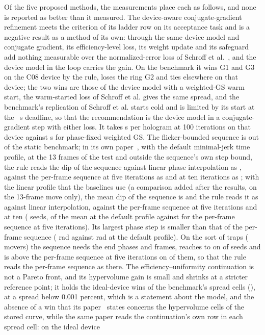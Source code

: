 Of the five proposed methods, the measurements place each as follows, and none is reported as better than it measured. The device-aware conjugate-gradient refinement meets the criterion of its ladder row on its acceptance task and is a negative result as a method of its own: through the same device model and conjugate gradient, its efficiency-level loss, its weight update and its safeguard add nothing measurable over the normalized-error loss of Schroff et al.~\cite{schroff}, and the device model in the loop carries the gain. On the benchmark it wins G1 and G3 on the C08 device by the rule, loses the ring G2 and ties elsewhere on that device; the two wins are those of the device model with a weighted-GS warm start, the warm-started loss of Schroff et al. gives the same spread, and the benchmark's replication of Schroff et al. starts cold and is limited by its start at the \dlReadS{}~s deadline, so that the recommendation is the device model in a conjugate-gradient step with either loss. It takes \benchSecDeviceBOne{} s per hologram at 100 iterations on that device against \benchSecDevicePF{} s for phase-fixed weighted GS. The flicker-bounded sequence is out of the static benchmark; in its own paper~\cite{flickerpaper}, with the default minimal-jerk time profile, at the 13 frames of the test and outside the sequence's own step bound, the rule reads the dip of the sequence against linear phase interpolation as , against the per-frame sequence at five iterations as  and at ten iterations as ; with the linear profile that the baselines use (a comparison added after the results, on the 13-frame move only), the mean dip of the sequence is  and the rule reads it as  against linear interpolation,  against the per-frame sequence at five iterations and  at ten ( seeds,  of the mean at the default profile against  for the per-frame sequence at five iterations). Its largest phase step is smaller than that of the per-frame sequence ( rad against  rad at the default profile). On the sort of  traps ( movers) the sequence needs the end phases and  frames, reaches  to  on  of  seeds and is above the per-frame sequence at five iterations on  of them, so that the rule reads the per-frame sequence as  there. The efficiency--uniformity continuation is not a Pareto front, and its hypervolume gain is small and shrinks at a stricter reference point; it holds the \benchWinsIdealProposed{} ideal-device wins of the benchmark's spread cells (\dlWinIdealProposedCells{}), at a spread below 0.001 percent, which is a statement about the model, and the absence of a win that its paper~\cite{b5paper} states concerns the hypervolume cells of the stored curve, while the same paper reads the continuation's own row in each spread cell: on the ideal device 